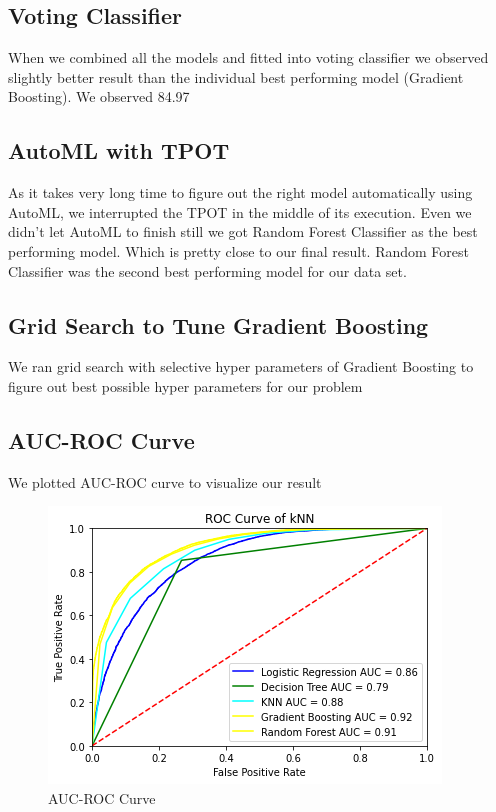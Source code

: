 \subsection{Voting Classifier}

When we combined all the models and fitted into voting classifier we observed slightly better result than the individual best performing model (Gradient Boosting). We observed 84.97 %

\subsection{AutoML with TPOT}
As it takes very long time to figure out the right model automatically using AutoML, we interrupted the TPOT in the middle of its execution. Even we didn’t let AutoML to finish still we got Random Forest Classifier as the best performing model. Which is pretty close to our final result. Random Forest Classifier was the second best performing model for our data set.

\subsection{Grid Search to Tune Gradient Boosting}
We ran grid search with selective hyper parameters of Gradient Boosting to figure out best possible hyper parameters for our problem



\subsection{AUC-ROC Curve}
We plotted AUC-ROC curve to visualize our result
\begin{figure}[h]
\centering
\includegraphics[width=.92\linewidth]{aucroc}
\caption{AUC-ROC Curve}%
\label{fig:aucroc}
\end{figure}

